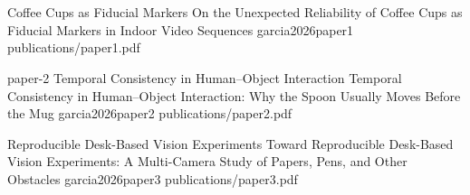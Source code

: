 %

\part{\myCompendiumSummaryPartTitle}
\label{part:compendium-summary}










\part{\myCompendiumPublicationsPartTitle}
\label{part:compendium-publications}

 {Coffee Cups as Fiducial Markers}
 {On the Unexpected Reliability of Coffee Cups as Fiducial Markers in Indoor Video Sequences}
 {garcia2026paper1}
 {publications/paper1.pdf}

 {paper-2}
 {Temporal Consistency in Human--Object Interaction}
 {Temporal Consistency in Human--Object Interaction: Why the Spoon Usually Moves Before the Mug}
 {garcia2026paper2}
 {publications/paper2.pdf}

 {Reproducible Desk-Based Vision Experiments}
 {Toward Reproducible Desk-Based Vision Experiments: A Multi-Camera Study of Papers, Pens, and Other Obstacles}
 {garcia2026paper3}
 {publications/paper3.pdf}

